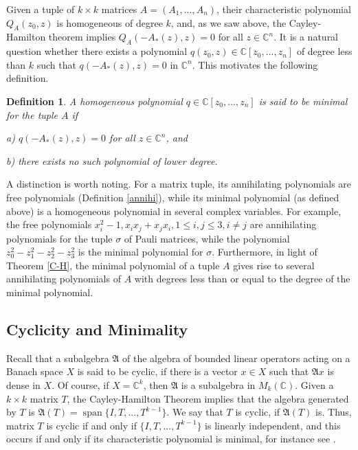 \documentclass[draft, 12pt, reqno]{amsart}
\newcommand{\C}{{\mathbb C}}
\numberwithin{equation}{section}
\DeclareMathOperator{\SP}{span}
\theoremstyle{plain}
\newtheorem{definition}[theorem]{Definition}
\begin{document}
Given a tuple of $k\times k$ matrices $A=(A_1, ..., A_n)$, their characteristic polynomial $Q_A(z_0,z)$ is homogeneous of degree $k$, and, as we saw above,  the Cayley-Hamilton theorem implies $Q_A(-A_*(z),z)=0$ for all $z\in \C^n$. It is a natural question whether there exists a polynomial
$q(z_0, z)\in \C[z_0, ..., z_n]$ of degree less than $k$ such that $q(-A_*(z), z)=0$ in $\C^n$. This motivates the following definition.
\begin{definition}\label{defminimal}
    A homogeneous polynomial $q\in \C[z_0, ..., z_n]$ is said to be {\em minimal} for the tuple $A$ if 
    
    a) $q(-A_*(z),z)=0$ for all $z\in \C^n$, and

    b) there exists no such polynomial of lower degree.
\end{definition}
\noindent A distinction is worth noting. For a matrix tuple, its annihilating polynomials are free polynomials (Definition \ref{annihi}), while its minimal polynomial (as defined above) is a homogeneous polynomial in several complex variables. For example, the free polynomials $x_i^2-1, x_ix_j+x_jx_i, 1\leq i, j\leq 3, i\neq j$ are annihilating polynomials for the tuple $\sigma$ of Pauli matrices, while the polynomial $z_0^2-z_1^2-z_2^2-z_3^2$ is the minimal polynomial for $\sigma$. Furthermore, in light of Theorem \ref{C-H}, the minimal polynomial of a tuple $A$ gives rise to several annihilating polynomials of $A$ with degrees less than or equal to the degree of the minimal polynomial. 

\subsection{Cyclicity and Minimality}

Recall that a subalgebra $\mathfrak{A}$ of the algebra of bounded linear operators acting on a Banach space $X$ is said to be cyclic, if there is a vector $x\in X$ such that $\mathfrak{A}x$ is dense in $X$. Of course, if $X=\C^k$, then $\mathfrak{A}$ is a subalgebra in $M_k(\C)$. Given a $k\times k$ matrix $T$, the Cayley-Hamilton Theorem implies that the algebra generated by $T$ is $\mathfrak{A}(T)=\SP\{I, T, ..., T^{k-1}\}$. We say that $T$ is cyclic, if $\mathfrak{A}(T)$ is.
Thus, matrix $T$ is cyclic if and only if $\{I, T, ..., T^{k-1}\}$ is linearly independent, and this occurs if and only if its characteristic polynomial is minimal, for instance see \cite[Sect. 7.1]{HK}. 
\end{document}

